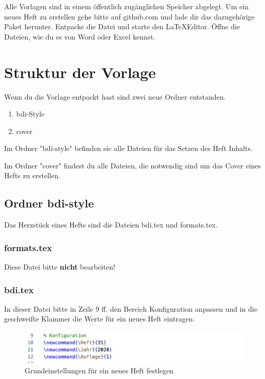\documentclass{article}
\begin{document}
Alle Vorlagen sind in einem öffentlich zugänglichen Speicher abgelegt. Um ein neues Heft zu erstellen gehe bitte auf github.com und lade dir das dazugehörige Paket herunter. Entpacke die Datei und starte den \LaTeX Editor. Öffne die Dateien, wie du es von Word oder Excel kennst. 

\section{Struktur der Vorlage}

Wenn du die Vorlage entpackt hast sind zwei neue Ordner entstanden. 

\begin{enumerate}
    \item bdi-Style
    \item cover
\end{enumerate}
   
Im Ordner "bdi-style" befinden sie alle Dateien für das Setzen des Heft Inhalts.

Im Ordner "cover" findest du alle Dateien, die notwendig sind um das Cover eines Hefts zu erstellen.

\subsection{Ordner bdi-style}

Das Herzstück eines Hefts sind die Dateien bdi.tex und formats.tex. 

\subsubsection*{formats.tex}

Diese Datei bitte {\bf nicht} bearbeiten!

\subsubsection*{bdi.tex}
In dieser Datei bitte in Zeile 9 ff. den Bereich Konfiguration anpassen und in die geschweifte Klammer die Werte für ein neues Heft eintragen. 

\begin{figure}
    \centering
    \caption{Grundeinstellungen für ein neues Heft festlegen}
    \includegraphics[scale=0.8]{heftkonfiguration-festlegen.png}
\end{figure}
\end{document}

